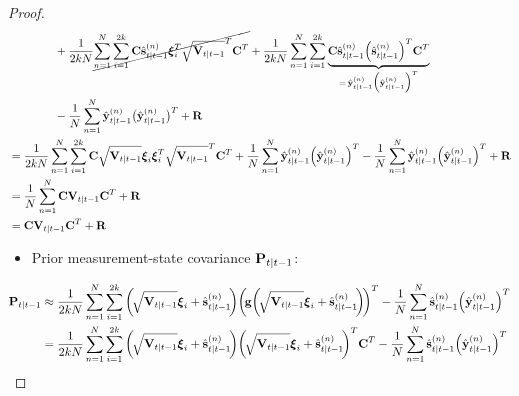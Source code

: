 \begin{proof}
\begin{align*}
						&\qquad\qquad + \frac{1}{2kN} \cancel{\sum_{n = 1}^{N} \sum_{i = 1}^{2k} \boldsymbol{\mathrm{C}} \hat{\boldsymbol{\mathrm{s}}}_{t \vert t - 1}^{(n)} \boldsymbol{\mathrm{\xi}}_i^T \sqrt{\boldsymbol{\mathrm{V}}_{t \vert t - 1}}^T \boldsymbol{\mathrm{C}}^T} + \frac{1}{2kN} \sum_{n = 1}^{N} \sum_{i = 1}^{2k} \underbrace{\boldsymbol{\mathrm{C}} \hat{\boldsymbol{\mathrm{s}}}_{t \vert t - 1}^{(n)} \Big(\hat{\boldsymbol{\mathrm{s}}}_{t \vert t - 1}^{(n)}\Big)^T \boldsymbol{\mathrm{C}}^T}_{=\, \hat{\boldsymbol{\mathrm{y}}}_{t \vert t - 1}^{(n)} \Big( \hat{\boldsymbol{\mathrm{y}}}_{t \vert t - 1}^{(n)} \Big)^T} \\
						&\qquad\qquad - \frac{1}{N} \sum_{n = 1}^{N} \hat{\boldsymbol{\mathrm{y}}}_{t \vert t - 1}^{(n)} \big( \hat{\boldsymbol{\mathrm{y}}}_{t \vert t - 1}^{(n)} \big)^T + \boldsymbol{\mathrm{R}} \\
					&= \frac{1}{2kN} \sum_{n = 1}^{N} \sum_{i = 1}^{2k} \boldsymbol{\mathrm{C}} \sqrt{\boldsymbol{\mathrm{V}}_{t \vert t - 1}} \boldsymbol{\mathrm{\xi}}_i \boldsymbol{\mathrm{\xi}}_i^T \sqrt{\boldsymbol{\mathrm{V}}_{t \vert t - 1}}^T \boldsymbol{\mathrm{C}}^T + \frac{1}{N} \sum_{n = 1}^{N} \hat{\boldsymbol{\mathrm{y}}}_{t \vert t - 1}^{(n)} \Big( \hat{\boldsymbol{\mathrm{y}}}_{t \vert t - 1}^{(n)} \Big)^T - \frac{1}{N} \sum_{n = 1}^{N} \hat{\boldsymbol{\mathrm{y}}}_{t \vert t - 1}^{(n)} \Big( \hat{\boldsymbol{\mathrm{y}}}_{t \vert t - 1}^{(n)} \Big)^T + \boldsymbol{\mathrm{R}} \\
					&= \frac{1}{N} \sum_{n = 1}^{N} \boldsymbol{\mathrm{C}} \boldsymbol{\mathrm{V}}_{t \vert t - 1} \boldsymbol{\mathrm{C}}^T + \boldsymbol{\mathrm{R}} \\
					&= \boldsymbol{\mathrm{C}} \boldsymbol{\mathrm{V}}_{t \vert t - 1} \boldsymbol{\mathrm{C}}^T + \boldsymbol{\mathrm{R}}
			\end{align*}
			\begin{itemize}
				\item Prior measurement-state covariance \( \boldsymbol{\mathrm{P}}_{t \vert t - 1} \):
			\end{itemize}
			\begin{align*}
				\mat{P}_{t \subgiven t - 1}
					&\approx \frac{1}{2kN} \sum_{n = 1}^{N} \sum_{i = 1}^{2k} \bigg(\!\sqrt{\mat{V}_{t \subgiven t - 1}} \vec{\xi}_i + \hat{\vec{s}}_{t \subgiven t - 1}^{(n)}\!\bigg) \bigg(\!\vec{g}\bigg(\!\sqrt{\mat{V}_{t \subgiven t - 1}} \vec{\xi}_i + \hat{\vec{s}}_{t \subgiven t - 1}^{(n)}\!\bigg)\!\bigg)^T - \frac{1}{N} \sum_{n = 1}^{N} \hat{\vec{s}}_{t \subgiven t - 1}^{(n)} \Big( \hat{\vec{y}}_{t \subgiven t - 1}^{(n)} \Big)^T \\
					&= \frac{1}{2kN} \sum_{n = 1}^{N} \sum_{i = 1}^{2k} \bigg(\!\sqrt{\mat{V}_{t \subgiven t - 1}} \vec{\xi}_i + \hat{\vec{s}}_{t \subgiven t - 1}^{(n)}\!\bigg) \bigg(\!\sqrt{\mat{V}_{t \subgiven t - 1}} \vec{\xi}_i + \hat{\vec{s}}_{t \subgiven t - 1}^{(n)}\!\bigg)^T \mat{C}^T - \frac{1}{N} \sum_{n = 1}^{N} \hat{\vec{s}}_{t \subgiven t - 1}^{(n)} \Big( \hat{\vec{y}}_{t \subgiven t - 1}^{(n)} \Big)^T \\

\end{align*}
\end{proof}
